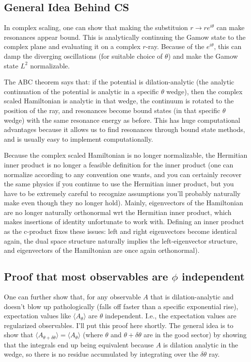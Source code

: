 \subsection{General Idea Behind CS}

In complex scaling, one can show that making the substituion $r\rightarrow re^{i\theta}$ can make resonances appear bound. This is analytically continuing the Gamow state to the complex plane and evaluating it on a complex $r$-ray. Because of the $e^{i\theta}$, this can damp the diverging oscillations (for suitable choice of $\theta$) and make the Gamow state $L^2$ normalizable.

The ABC theorem says that: if the potential is dilation-analytic (the analytic continuation of the potential is analytic in a specific $\theta$ wedge), then the complex scaled Hamiltonian is analytic in that wedge, the continuum is rotated to the position of the ray, and resonances become bound states (in that specific $\theta$ wedge) with the same resonance energy as before. This has huge computational advantages because it allows us to find resonances through bound state methods, and is usually easy to implement computationally.

Because the complex scaled Hamiltonian is no longer normalizable, the Hermitian inner product is no longer a feasible definition for the inner product (one can normalize according to any convention one wants, and you can certainly recover the same physics if you continue to use the Hermitian inner product, but you have to be extremely careful to recognize assumptions you'll probably naturally make even though they no longer hold). Mainly, eigenvectors of the Hamiltonian are no longer naturally orthonormal wrt the Hermitian inner product, which makes insertions of identity unfortunate to work with. Defining an inner product as the c-product fixes these issues: left and right eigenvectors become identical again, the dual space structure naturally implies the left-eigenvector structure, and eigenvectors of the Hamiltonian are once again orthonormal).

\subsection{\texorpdfstring{Proof that most observables are $\phi$ independent}{Proof that most observables are phi independent}}\label{sssection:obs_phi_indep}
One can further show that, for any observable $A$ that is dilation-analytic and doesn't blow up pathologically (falls off faster than a specific exponential rise), expectation values like $\langle A_\theta \rangle$ are $\theta$ independent. I.e., the expectation values are regularized observables. I'll put this proof here shortly. The general idea is to show that $\langle A_{\theta+\delta\theta}\rangle = \langle A_{\theta}\rangle$ (where $\theta$ and $\theta+\delta\theta$ are in the good sector) by showing that the integrals end up being equivalent because $A$ is dilation analytic in the wedge, so there is no residue accumulated by integrating over the $\delta \theta$ ray.
